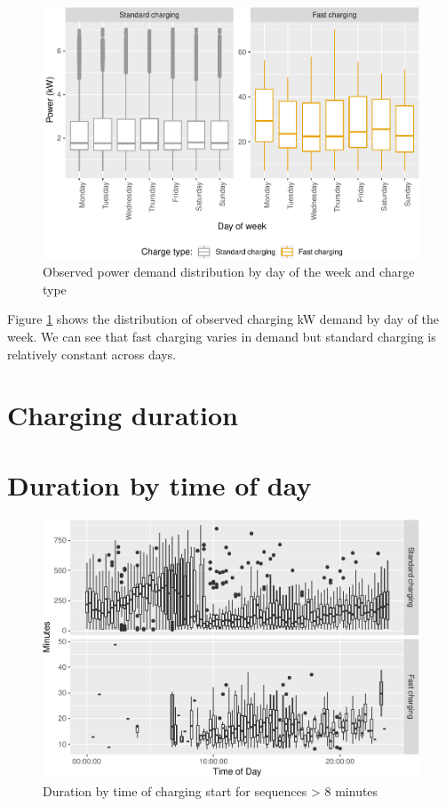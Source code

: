 \documentclass[]{article}
\begin{document}
\begin{figure}
\centering
\includegraphics{EVBB_report_files/figure-latex/dailyPower-1.pdf}
\caption{\label{fig:dailyPower}Observed power demand distribution by day of
the week and charge type}
\end{figure}

Figure \ref{fig:dailyPower} shows the distribution of observed charging
kW demand by day of the week. We can see that fast charging varies in
demand but standard charging is relatively constant across days.

\section{Charging duration}\label{duration}

\section{Duration by time of day}\label{duration-by-time-of-day}

\begin{figure}
\centering
\includegraphics{EVBB_report_files/figure-latex/durationTimeBox-1.pdf}
\caption{\label{fig:durationTimeBox}Duration by time of charging start for
sequences \textgreater{} 8 minutes}
\end{figure}
\end{document}

